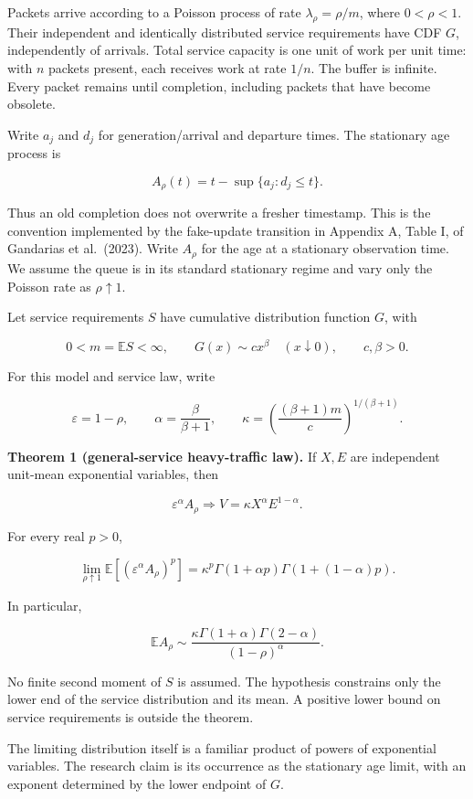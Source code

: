 \documentclass[
  11pt,
  a4paper,
]{scrartcl}
\begin{document}
Packets arrive according to a Poisson process of rate
\(\lambda_\rho=\rho/m\), where \(0<\rho<1\). Their independent and
identically distributed service requirements have CDF \(G\),
independently of arrivals. Total service capacity is one unit of work
per unit time: with \(n\) packets present, each receives work at rate
\(1/n\). The buffer is infinite. Every packet remains until completion,
including packets that have become obsolete.

Write \(a_j\) and \(d_j\) for generation/arrival and departure times.
The stationary age process is

\[
A_\rho(t)=t-\sup\{a_j:d_j\leq t\}.
\]

Thus an old completion does not overwrite a fresher timestamp. This is
the convention implemented by the fake-update transition in Appendix A,
Table I, of Gandarias et al.~(2023). Write \(A_\rho\) for the age at a
stationary observation time. We assume the queue is in its standard
stationary regime and vary only the Poisson rate as \(\rho\uparrow1\).

Let service requirements \(S\) have cumulative distribution function
\(G\), with

\[
0<m=\mathbb ES<\infty,\qquad
G(x)\sim c x^\beta\quad(x\downarrow0),\qquad c,\beta>0.
\tag{G1}
\]

For this model and service law, write

\[
\varepsilon=1-\rho,\qquad
\alpha=\frac{\beta}{\beta+1},\qquad
\kappa=\left(\frac{(\beta+1)m}{c}\right)^{1/(\beta+1)}.
\]

\textbf{Theorem 1 (general-service heavy-traffic law).} If \(X,E\) are
independent unit-mean exponential variables, then

\[
\varepsilon^\alpha A_\rho\Rightarrow
V=\kappa X^\alpha E^{1-\alpha}.
\tag{G2}
\]

For every real \(p>0\),

\[
\lim_{\rho\uparrow1}\mathbb E[(\varepsilon^\alpha A_\rho)^p]
=\kappa^p\Gamma(1+\alpha p)\Gamma(1+(1-\alpha)p).
\tag{G3}
\]

In particular,

\[
\mathbb EA_\rho\sim
\frac{\kappa\Gamma(1+\alpha)\Gamma(2-\alpha)}{(1-\rho)^\alpha}.
\tag{G4}
\]

No finite second moment of \(S\) is assumed. The hypothesis constrains
only the lower end of the service distribution and its mean. A positive
lower bound on service requirements is outside the theorem.

The limiting distribution itself is a familiar product of powers of
exponential variables. The research claim is its occurrence as the
stationary age limit, with an exponent determined by the lower endpoint
of \(G\).
\end{document}

